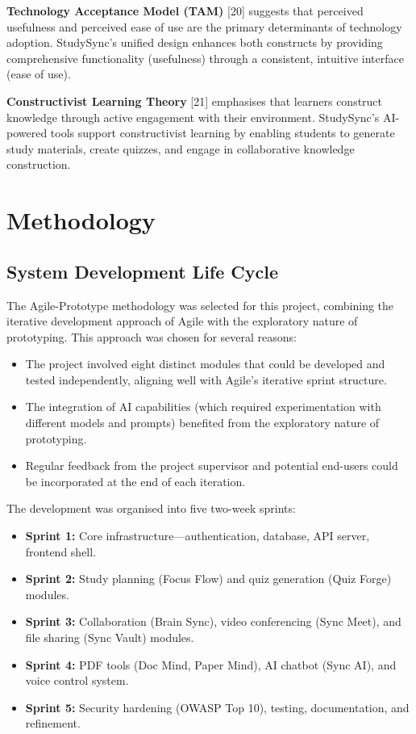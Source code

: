 \documentclass[12pt,a4paper]{report}
\begin{document}
\textbf{Technology Acceptance Model (TAM)} [20] suggests that perceived usefulness and perceived ease of use are the primary determinants of technology adoption. StudySync's unified design enhances both constructs by providing comprehensive functionality (usefulness) through a consistent, intuitive interface (ease of use).

\textbf{Constructivist Learning Theory} [21] emphasises that learners construct knowledge through active engagement with their environment. StudySync's AI-powered tools support constructivist learning by enabling students to generate study materials, create quizzes, and engage in collaborative knowledge construction.

\chapter{Methodology}

\section{System Development Life Cycle}

The Agile-Prototype methodology was selected for this project, combining the iterative development approach of Agile with the exploratory nature of prototyping. This approach was chosen for several reasons:

\begin{itemize}
    \item The project involved eight distinct modules that could be developed and tested independently, aligning well with Agile's iterative sprint structure.
    \item The integration of AI capabilities (which required experimentation with different models and prompts) benefited from the exploratory nature of prototyping.
    \item Regular feedback from the project supervisor and potential end-users could be incorporated at the end of each iteration.
\end{itemize}

The development was organised into five two-week sprints:

\begin{itemize}
    \item \textbf{Sprint 1:} Core infrastructure---authentication, database, API server, frontend shell.
    \item \textbf{Sprint 2:} Study planning (Focus Flow) and quiz generation (Quiz Forge) modules.
    \item \textbf{Sprint 3:} Collaboration (Brain Sync), video conferencing (Sync Meet), and file sharing (Sync Vault) modules.
    \item \textbf{Sprint 4:} PDF tools (Doc Mind, Paper Mind), AI chatbot (Sync AI), and voice control system.
    \item \textbf{Sprint 5:} Security hardening (OWASP Top 10), testing, documentation, and refinement.
\end{itemize}
\end{document}
